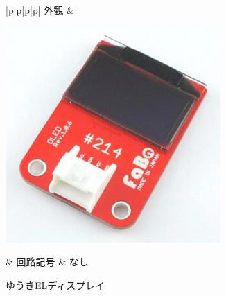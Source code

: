 \begin{figure}[H]
	\begin{tabular}{|p{\colH}|p{\colI}|p{\colH}|p{\colI}|} \hline
	外観 & 
	\begin{minipage}[t]{\linewidth}
    \smallskip
      \centering
      \includegraphics[width=\linewidth]{images/chap05/text05-img032.png}
      \caption{ゆうきELディスプレイ}
      \smallskip
    \end{minipage} &
    回路記号 & なし\\ \hline
  \end{tabular}
\end{figure}